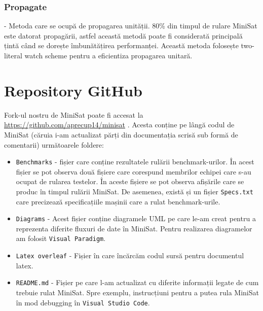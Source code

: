 \documentclass{llncs}
\begin{document}
\subsubsection{Propagate} - Metoda care se ocupă de propagarea unității. 80\% din timpul de rulare MiniSat este datorat propagării, astfel această metodă poate fi considerată principală țintă când se dorește îmbunătățirea performanței\cite{ref_MiniSat_Extensible_SAT_Paper}. Această metoda folosește two-literal watch scheme pentru a eficientiza propagarea unitară.

\section{Repository GitHub}
Fork-ul nostru de MiniSat poate fi accesat la \href{https://github.com/aprecup14/minisat}{https://github.com/aprecup14/minisat} \cite{ref_MiniSat_our_fork}. Acesta conține pe lângă codul de MiniSat (căruia i-am actualizat părți din documentația scrisă sub formă de comentarii) următoarele foldere:
\begin{itemize}
    \item \texttt{Benchmarks} - fișier care conține rezultatele rulării benchmark-urilor. În acest fișier se pot observa două fișiere care corespund membrilor echipei care s-au ocupat de rularea testelor. În aceste fișiere se pot observa afișările care se produc în timpul rulării MiniSat. De asemenea, există și un fișier \texttt{Specs.txt} care precizează specificațiile mașinii care a rulat benchmark-urile.
    \item \texttt{Diagrams} - Acest fișier conține diagramele UML pe care le-am creat pentru a reprezenta diferite fluxuri de date în MiniSat. Pentru realizarea diagramelor am folosit \texttt{Visual Paradigm}.
    \item \texttt{Latex overleaf} - Fișier în care încărcăm codul sursă pentru documentul latex.
    \item \texttt{README.md} - Fișier pe care l-am actualizat cu diferite informații legate de cum trebuie rulat MiniSat. Spre exemplu, instrucțiuni pentru a putea rula MiniSat în mod debugging în \texttt{Visual Studio Code}.
\end{itemize}
\end{document}
